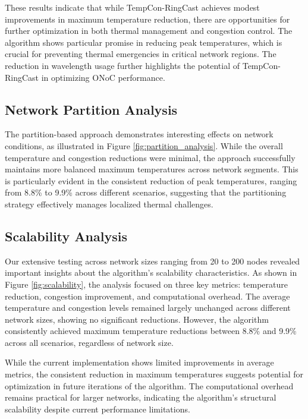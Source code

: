 \documentclass[conference]{IEEEtran}
\begin{document}
These results indicate that while TempCon-RingCast achieves modest improvements in maximum temperature reduction, there are opportunities for further optimization in both thermal management and congestion control. The algorithm shows particular promise in reducing peak temperatures, which is crucial for preventing thermal emergencies in critical network regions. The reduction in wavelength usage further highlights the potential of TempCon-RingCast in optimizing ONoC performance.

\subsection{Network Partition Analysis}
The partition-based approach demonstrates interesting effects on network conditions, as illustrated in Figure \ref{fig:partition_analysis}. While the overall temperature and congestion reductions were minimal, the approach successfully maintains more balanced maximum temperatures across network segments. This is particularly evident in the consistent reduction of peak temperatures, ranging from 8.8\% to 9.9\% across different scenarios, suggesting that the partitioning strategy effectively manages localized thermal challenges.

\subsection{Scalability Analysis}
Our extensive testing across network sizes ranging from 20 to 200 nodes revealed important insights about the algorithm's scalability characteristics. As shown in Figure \ref{fig:scalability}, the analysis focused on three key metrics: temperature reduction, congestion improvement, and computational overhead. The average temperature and congestion levels remained largely unchanged across different network sizes, showing no significant reductions. However, the algorithm consistently achieved maximum temperature reductions between 8.8\% and 9.9\% across all scenarios, regardless of network size.

While the current implementation shows limited improvements in average metrics, the consistent reduction in maximum temperatures suggests potential for optimization in future iterations of the algorithm. The computational overhead remains practical for larger networks, indicating the algorithm's structural scalability despite current performance limitations.
\end{document}
